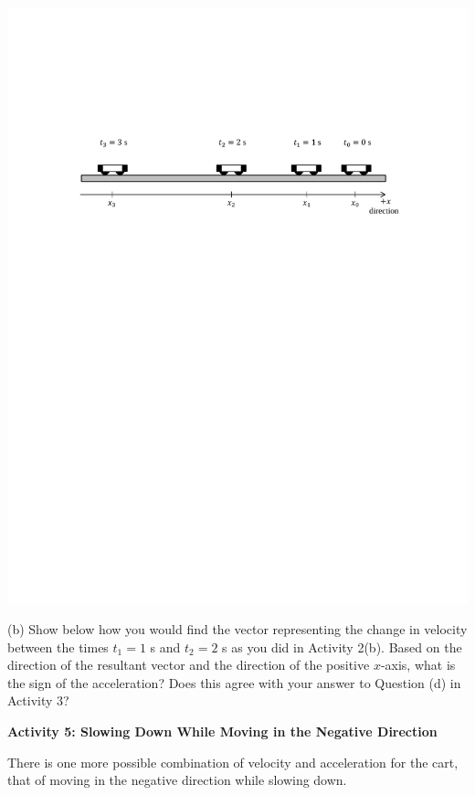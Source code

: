 {\par\centering \includegraphics{slowing/carts_speeding.pdf} \par}

(b) Show below how you would find the vector representing the change in velocity
between the times $t_1 = 1$ s and $t_2 = 2$ s as you did in Activity 2(b). Based on the 
direction of the resultant vector and the direction of the positive $x$-axis, 
what is the sign of the acceleration? Does this agree with your answer to Question (d) in Activity 3?
\vspace{20mm}

\textbf{Activity 5: Slowing Down While Moving in the Negative Direction}

There is one more possible combination of velocity and acceleration for the
cart, that of moving in the negative direction while slowing down. 

